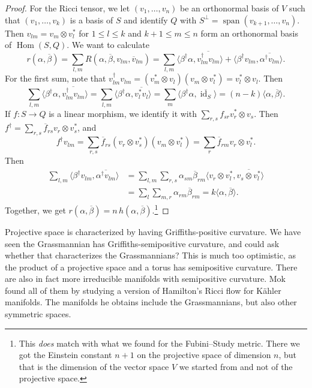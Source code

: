 \documentclass[11pt]{article}
\newtheorem*{proof}{Proof}
\def\ov#1{\overline{#1}}
\DeclareMathOperator{\Span}{span}
\DeclareMathOperator{\Hom}{Hom}
\DeclareMathOperator{\id}{id}
\begin{document}
\begin{proof}
For the Ricci tensor, we let $(v_1,\ldots,v_n)$ be an orthonormal basis of $V$ such that $(v_1,\ldots,v_k)$ is a basis of $S$ and identify $Q$ with $S^\perp = \Span(v_{k+1},\ldots,v_n)$.
Then $v_{lm} = v_m \otimes v_l^*$ for $1 \leq l \leq k$ and $k+1 \leq m \leq n$ form an orthonormal basis of $\Hom(S,Q)$.
We want to calculate
\[
r(\alpha,\ov\beta)
= \sum_{l,m} R(\alpha,\ov\beta,v_{lm}, \ov v_{lm})
= \sum_{l,m}
\langle \beta^\dagger \alpha, \ov{ v_{lm}^\dagger v_{lm}} \rangle
+ \langle \beta^\dagger v_{lm}, \ov{ \alpha^\dagger v_{lm} }\rangle.
\]
For the first sum, note that $v_{lm}^\dagger v_{lm} = (v_m^* \otimes v_l)(v_m \otimes v_l^*) = v_l^* \otimes v_l$. Then
\[
\sum_{l,m} \langle \beta^\dagger \alpha, \ov{ v_{lm}^\dagger v_{lm}} \rangle
= \sum_{l,m} \langle \beta^\dagger \alpha, \ov{ v_{l}^* v_{l}} \rangle
= \sum_{m} \langle \beta^\dagger \alpha, \ov{\id_S}\rangle
= (n-k) \langle \alpha, \ov \beta \rangle.
\]
If $f : S \to Q$ is a linear morphism, we identify it with $\sum_{r,s}
f_{sr} v_r^* \otimes v_s$. Then $f^\dagger = \sum_{r,s} \ov f_{rs}
v_r \otimes v_s^*$, and
\[
f^\dagger v_{lm}
= \sum_{r,s} \ov f_{rs} (v_r \otimes v_s^*)(v_m \otimes v_l^*)
= \sum_{r} \ov f_{rm} v_r \otimes v_l^*.
\]
Then
\begin{align*}
\sum_{l,m} \langle \beta^\dagger v_{lm}, \ov{ \alpha^\dagger v_{lm} }\rangle
&= \sum_{l,m} \sum_{r,s} \alpha_{sm} \ov \beta_{rm}
\langle v_r \otimes v_l^*, \ov{v_s \otimes v_l^*} \rangle
\\
&= \sum_{l} \sum_{m,r} \alpha_{rm} \ov \beta_{rm}
= k \langle \alpha, \ov\beta \rangle.
\end{align*}
Together, we get $r(\alpha,\ov\beta) = n \, h(\alpha, \ov\beta)$.\footnote{This \emph{does} match with what we found for the Fubini--Study metric. There we got the Einstein constant $n+1$ on the projective space of dimension $n$, but that is the dimension of the vector space $V$ we started from and not of the projective space.}
\end{proof}


Projective space is characterized by having Griffiths-positive
curvature. We have seen the Grassmannian has Griffiths-semipositive
curvature, and could ask whether that characterizes the Grassmannians?
This is much too optimistic, as the product of a projective space and
a torus has semipositive curvature. There are also in fact more
irreducible manifolds with semipositive curvature.
Mok~\cite{mok1988uniformization} found all of them by studying a version of Hamilton's Ricci flow for K\"ahler manifolds. The manifolds he obtains include the
Grassmannians, but also other symmetric spaces.
\end{document}
